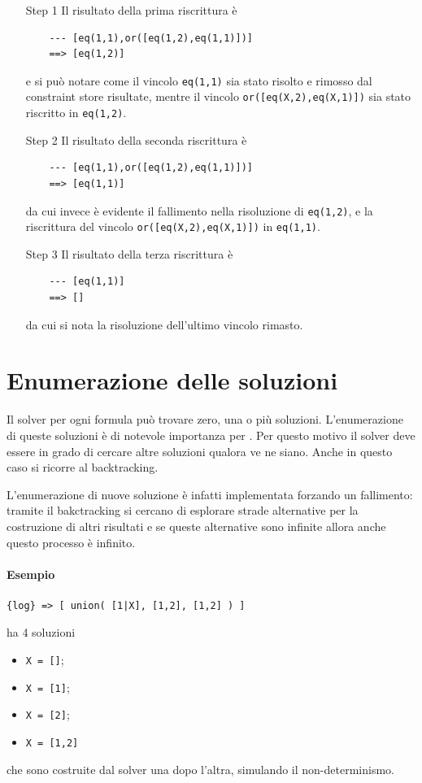 \documentclass[12pt,a4paper,openright]{book} %
\begin{document}
\begin{itemize}

	\item[Step 1] Il risultato della prima riscrittura è
	\begin{verbatim}
	--- [eq(1,1),or([eq(1,2),eq(1,1)])]
	==> [eq(1,2)]
	\end{verbatim}
	e si può notare come il vincolo \verb|eq(1,1)| sia stato
        risolto e rimosso dal constraint store risultate, mentre il
        vincolo \verb|or([eq(X,2),eq(X,1)])| sia stato riscritto in
        \verb|eq(1,2)|.

	\item[Step 2] Il risultato della seconda riscrittura è
	\begin{verbatim}
	--- [eq(1,1),or([eq(1,2),eq(1,1)])]
	==> [eq(1,1)]
	\end{verbatim}
	da cui invece è evidente il fallimento nella risoluzione di
        \verb|eq(1,2)|, e la riscrittura del vincolo
        \verb|or([eq(X,2),eq(X,1)])| in \verb|eq(1,1)|.

	\item[Step 3] Il risultato della terza riscrittura è
	\begin{verbatim}
	--- [eq(1,1)]
	==> []
	\end{verbatim}
	da cui si nota la risoluzione dell'ultimo vincolo rimasto.

\end{itemize}

\section{Enumerazione delle soluzioni}
\label{sec:lsetpicat_solutions}

Il solver per ogni formula può trovare zero, una o più
soluzioni. L'enumerazione di queste soluzioni è di notevole importanza
per \lset{}. Per questo motivo il solver deve essere in grado di
cercare altre soluzioni qualora ve ne siano. Anche in questo caso si
ricorre al backtracking.

L'enumerazione di nuove soluzione è infatti implementata forzando un
fallimento: tramite il bakctracking si cercano di esplorare strade
alternative per la costruzione di altri risultati e se queste
alternative sono infinite allora anche questo processo è infinito.

\paragraph{Esempio}
\begin{verbatim}
{log} => [ union( [1|X], [1,2], [1,2] ) ]
\end{verbatim}
ha 4 soluzioni
\begin{itemize}
	\item \verb|X = []|;
	\item \verb|X = [1]|;
	\item \verb|X = [2]|;
	\item \verb|X = [1,2]|
\end{itemize}
che sono costruite dal solver una dopo l'altra, simulando il
non-determinismo.
\end{document}
